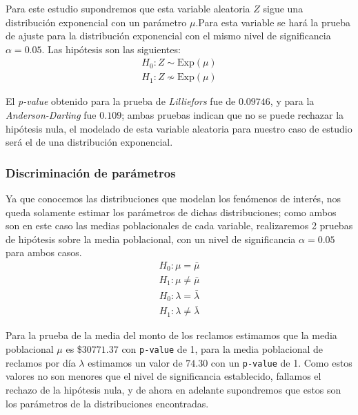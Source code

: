 \documentclass[journal]{IEEEtran}
\begin{document}
                Para este estudio supondremos que esta variable aleatoria $Z$ sigue una distribución exponencial con un parámetro $\mu$.Para esta variable se hará la prueba de ajuste para la distribución exponencial con el mismo nivel de significancia $\alpha = 0.05$. Las hipótesis son las siguientes:
                \begin{gather*}
                    H_0: Z \sim\text{Exp}(\mu) \\
                    H_1 : Z \not \sim \text{Exp}(\mu)
                \end{gather*}
                
                El \textit{p-value} obtenido para la prueba de \emph{Lilliefors} fue de $0.09746$, y para la \textit{Anderson-Darling} fue $0.109$; ambas pruebas indican que no se puede rechazar la hipótesis nula, el modelado de esta variable aleatoria para nuestro caso de estudio será el de una distribución exponencial.
            
            \subsubsection{Discriminación de parámetros} \label{sec:parameter-estimation}
                    
                Ya que conocemos las distribuciones que modelan los fenómenos de interés, nos queda solamente estimar los parámetros de dichas distribuciones; como ambos son en este caso las medias poblacionales de cada variable, realizaremos 2 pruebas de hipótesis sobre la media poblacional, con un nivel de significancia $\alpha = 0.05$ para ambos casos.
                \begin{gather*}
                    H_0: \mu = \bar{\mu} \\
                    H_1: \mu \neq \bar{\mu}
                \end{gather*}
                \begin{gather*}
                    H_0: \lambda = \bar{\lambda} \\
                    H_1: \lambda \neq \bar{\lambda}
                \end{gather*}

                Para la prueba de la media del monto de los reclamos estimamos que la media poblacional $\mu$ es \$$30771.37$ con \texttt{p-value} de 1, para la media poblacional de reclamos por día $\lambda$ estimamos un valor de $74.30$ con un \texttt{p-value} de 1. Como estos valores no son menores que el nivel de significancia establecido, fallamos el rechazo de la hipótesis nula, y de ahora en adelante supondremos que estos son los parámetros de la distribuciones encontradas.
                
\end{document}

